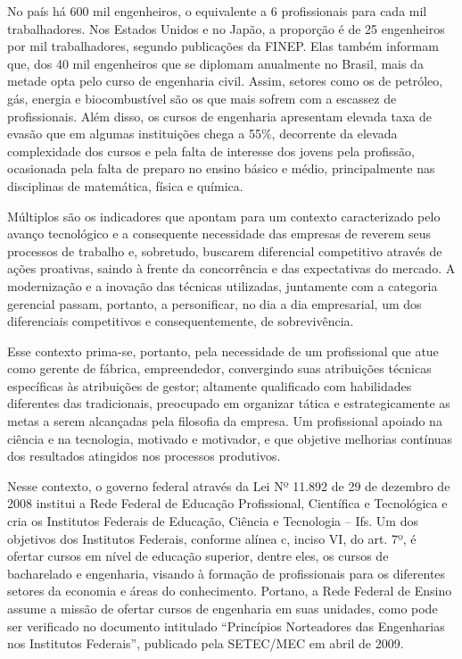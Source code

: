 No país há 600 mil engenheiros, o equivalente a 6 profissionais para cada mil trabalhadores. Nos Estados Unidos e no Japão, a proporção é de 25 engenheiros por mil trabalhadores, segundo publicações da FINEP. Elas também informam que, dos 40 mil engenheiros que se diplomam anualmente no Brasil, mais da metade opta pelo curso de engenharia civil. Assim, setores como os de petróleo, gás, energia e biocombustível são os que mais sofrem com a escassez de profissionais. Além disso, os cursos de engenharia apresentam elevada taxa de evasão que em algumas instituições chega a 55\%, decorrente da elevada complexidade dos cursos e pela falta de interesse dos jovens pela profissão, ocasionada pela falta de preparo no ensino básico e médio, principalmente nas disciplinas de matemática, física e química.

Múltiplos são os indicadores que apontam para um contexto caracterizado pelo avanço tecnológico e a consequente necessidade das empresas de reverem seus processos de trabalho e, sobretudo, buscarem diferencial competitivo através de ações proativas, saindo à frente da concorrência e das expectativas do mercado. A modernização e a inovação das técnicas utilizadas, juntamente com a categoria gerencial passam, portanto, a personificar, no dia a dia empresarial, um dos diferenciais competitivos e consequentemente, de sobrevivência.

Esse contexto prima-se, portanto, pela necessidade de um profissional que atue como gerente de fábrica, empreendedor, convergindo suas atribuições técnicas específicas às atribuições de gestor; altamente qualificado com habilidades diferentes das tradicionais, preocupado em organizar tática e estrategicamente as metas a serem alcançadas pela filosofia da empresa. Um profissional apoiado na ciência e na tecnologia, motivado e motivador, e que objetive melhorias contínuas dos resultados atingidos nos processos produtivos.

Nesse contexto, o governo federal através da Lei Nº 11.892 de 29 de dezembro de 2008 institui a Rede Federal de Educação Profissional, Científica e Tecnológica e cria os Institutos Federais de Educação, Ciência e Tecnologia – Ifs. Um dos objetivos dos Institutos Federais, conforme alínea c, inciso VI, do art. 7º, é ofertar cursos em nível de educação superior, dentre eles, os cursos de bacharelado e engenharia, visando à formação de profissionais para os diferentes setores da economia e áreas do conhecimento. Portano, a Rede Federal de Ensino assume a missão de ofertar cursos de engenharia em suas unidades, como pode ser verificado no documento intitulado “Princípios Norteadores das Engenharias nos Institutos Federais”, publicado pela SETEC/MEC em abril de 2009.


